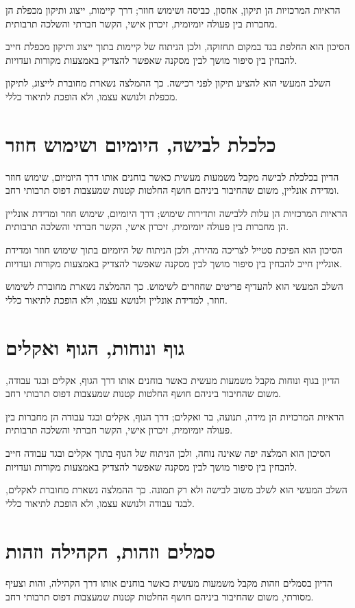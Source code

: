הראיות המרכזיות הן תיקון, אחסון, כביסה ושימוש חוזר; דרך קיימות, ייצוג ותיקון מכפלת הן מחברות בין פעולה יומיומית, זיכרון אישי, הקשר חברתי והשלכה תרבותית.

הסיכון הוא החלפת בגד במקום תחזוקה, ולכן הניתוח של קיימות בתוך ייצוג ותיקון מכפלת חייב להבחין בין סיפור מושך לבין מסקנה שאפשר להצדיק באמצעות מקורות ועדויות.

השלב המעשי הוא להציע תיקון לפני רכישה. כך ההמלצה נשארת מחוברת לייצוג, לתיקון מכפלת ולנושא עצמו, ולא הופכת לתיאור כללי.

\section{כלכלת לבישה, היומיום ושימוש חוזר}
הדיון בכלכלת לבישה מקבל משמעות מעשית כאשר בוחנים אותו דרך היומיום, שימוש חוזר ומדידת אונליין, משום שהחיבור ביניהם חושף החלטות קטנות שמעצבות דפוס תרבותי רחב.

הראיות המרכזיות הן עלות ללבישה ותדירות שימוש; דרך היומיום, שימוש חוזר ומדידת אונליין הן מחברות בין פעולה יומיומית, זיכרון אישי, הקשר חברתי והשלכה תרבותית.

הסיכון הוא הפיכת סטייל לצריכה מהירה, ולכן הניתוח של היומיום בתוך שימוש חוזר ומדידת אונליין חייב להבחין בין סיפור מושך לבין מסקנה שאפשר להצדיק באמצעות מקורות ועדויות.

השלב המעשי הוא להעדיף פריטים שחוזרים לשימוש. כך ההמלצה נשארת מחוברת לשימוש חוזר, למדידת אונליין ולנושא עצמו, ולא הופכת לתיאור כללי.

\section{גוף ונוחות, הגוף ואקלים}
הדיון בגוף ונוחות מקבל משמעות מעשית כאשר בוחנים אותו דרך הגוף, אקלים ובגד עבודה, משום שהחיבור ביניהם חושף החלטות קטנות שמעצבות דפוס תרבותי רחב.

הראיות המרכזיות הן מידה, תנועה, בד ואקלים; דרך הגוף, אקלים ובגד עבודה הן מחברות בין פעולה יומיומית, זיכרון אישי, הקשר חברתי והשלכה תרבותית.

הסיכון הוא המלצה יפה שאינה נוחה, ולכן הניתוח של הגוף בתוך אקלים ובגד עבודה חייב להבחין בין סיפור מושך לבין מסקנה שאפשר להצדיק באמצעות מקורות ועדויות.

השלב המעשי הוא לשלב משוב לבישה ולא רק תמונה. כך ההמלצה נשארת מחוברת לאקלים, לבגד עבודה ולנושא עצמו, ולא הופכת לתיאור כללי.

\section{סמלים וזהות, הקהילה וזהות}
הדיון בסמלים וזהות מקבל משמעות מעשית כאשר בוחנים אותו דרך הקהילה, זהות וצעיף מסורתי, משום שהחיבור ביניהם חושף החלטות קטנות שמעצבות דפוס תרבותי רחב.

